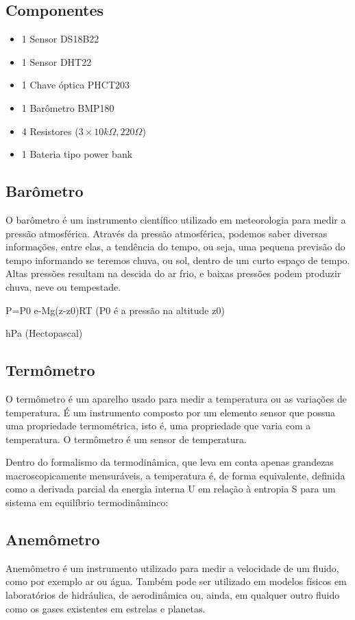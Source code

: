 \documentclass[twocolumn,11pt]{article}
\begin{document}
{\subsection{Componentes}
\begin{itemize}
\item 1 Sensor DS18B22
\item 1 Sensor DHT22
\item 1 Chave óptica PHCT203
\item 1 Barômetro BMP180
\item 4 Resistores (\(3 \times 10 k\Omega, 220 \Omega\))
\item 1 Bateria tipo power bank
\end{itemize}

\subsection{Barômetro}
O barômetro é um instrumento científico utilizado em meteorologia para medir a pressão atmosférica. Através da pressão atmosférica, podemos saber diversas informações, entre elas, a tendência do tempo, ou seja, uma pequena previsão do tempo informando se teremos chuva, ou sol, dentro de um curto espaço de tempo. Altas pressões resultam na descida do ar frio, e baixas pressões podem produzir chuva, neve ou tempestade.\par

P=P0  e-Mg(z-z0)RT    (P0 é a pressão na altitude z0)

hPa (Hectopascal)

\subsection{Termômetro}
O termômetro é um aparelho usado para medir a temperatura ou as variações de temperatura. É um instrumento composto por um elemento sensor que possua uma propriedade termométrica, isto é, uma propriedade que varia com a temperatura. O termômetro é um sensor de temperatura.\par
Dentro do formalismo da termodinâmica, que leva em conta apenas grandezas macroscopicamente mensuráveis, a temperatura é, de forma equivalente, definida como a derivada parcial da energia interna U em relação à entropia S para um sistema em equilíbrio termodinâminco:\par

\subsection{Anemômetro}
Anemômetro é um instrumento utilizado para medir a velocidade de um fluido, como por exemplo ar ou água. Também pode ser utilizado em modelos físicos em laboratórios de hidráulica, de aerodinâmica ou, ainda, em qualquer outro fluido como os gases existentes em estrelas e planetas.
}
\end{document}
